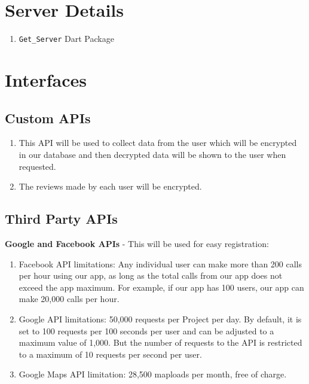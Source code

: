 \documentclass[11pt]{extarticle}
\begin{document}
\section{Server Details}
\begin{enumerate}[label={\alph*.}]
    \item \texttt{Get\_Server} Dart Package
\end{enumerate}

\section{Interfaces}
\subsection{Custom APIs}
\begin{enumerate}[label={\alph*.}]
    \item This API will be used to collect data from the user which will be encrypted in our database and then decrypted data will be shown to the user when requested.
    \item The reviews made by each user will be encrypted.
\end{enumerate}

\subsection{Third Party APIs}
\textbf{Google and Facebook APIs} - This will be used for easy registration:
\begin{enumerate}[label={\alph*.}]
    \item Facebook API limitations: Any individual user can make more than 200 calls per hour using our app, as long as the total calls from our app does not exceed the app maximum.
    For example, if our app has 100 users, our app can make 20,000 calls per hour.
    \item Google API limitations: 50,000 requests per Project per day. By default, it is set to 100 requests per 100 seconds per user and can be adjusted to a maximum value of 1,000. But the number of requests to the API is restricted to a maximum of 10 requests per second per user.
    \item Google Maps API limitation: 28,500 maploads per month, free of charge.
\end{enumerate}
\end{document}
